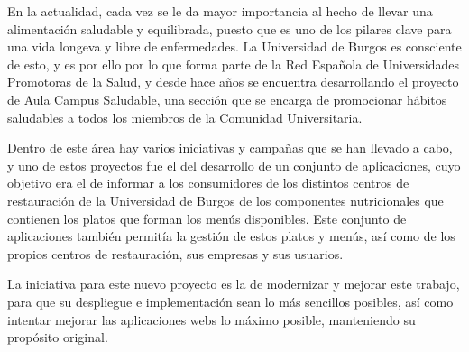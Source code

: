 
En la actualidad, cada vez se le da mayor importancia al hecho de llevar una alimentación saludable y equilibrada, puesto que es uno de los pilares clave para una vida longeva y libre de enfermedades. La Universidad de Burgos es consciente de esto, y es por ello por lo que forma parte de la Red Española de Universidades Promotoras de la Salud, y desde hace años se encuentra desarrollando el proyecto de Aula Campus Saludable, una sección que se encarga de promocionar hábitos saludables a todos los miembros de la Comunidad Universitaria.

Dentro de este área hay varios iniciativas y campañas que se han llevado a cabo, y uno de estos proyectos fue el del desarrollo de un conjunto de aplicaciones, cuyo objetivo era el de informar a los consumidores de los distintos centros de restauración de la Universidad de Burgos de los componentes nutricionales que contienen los platos que forman los menús disponibles. Este conjunto de aplicaciones también permitía la gestión de estos platos y menús, así como de los propios centros de restauración, sus empresas y sus usuarios.

La iniciativa para este nuevo proyecto es la de modernizar y mejorar este trabajo, para que su despliegue e implementación sean lo más sencillos posibles, así como intentar mejorar las aplicaciones webs lo máximo posible, manteniendo su propósito original.
